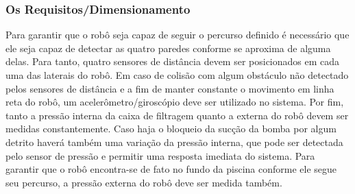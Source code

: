 \subsubsection{Os Requisitos/Dimensionamento}
Para garantir que o robô seja capaz de seguir o percurso definido é necessário que ele seja capaz de detectar as quatro paredes conforme se aproxima de alguma delas. Para tanto, quatro sensores de distância devem ser posicionados em cada uma das laterais do robô. Em caso de colisão com algum obstáculo não detectado pelos sensores de distância e a fim de manter constante o movimento em linha reta do robô, um acelerômetro/giroscópio deve ser utilizado no sistema. Por fim, tanto a pressão interna da caixa de filtragem quanto a externa do robô devem ser medidas constantemente. Caso haja o bloqueio da sucção da bomba por algum detrito haverá também uma variação da pressão interna, que pode ser detectada pelo sensor de pressão e permitir uma resposta imediata do sistema. Para garantir que o robô encontra-se de fato no fundo da piscina conforme ele segue seu percurso, a pressão externa do robô deve ser medida também.

